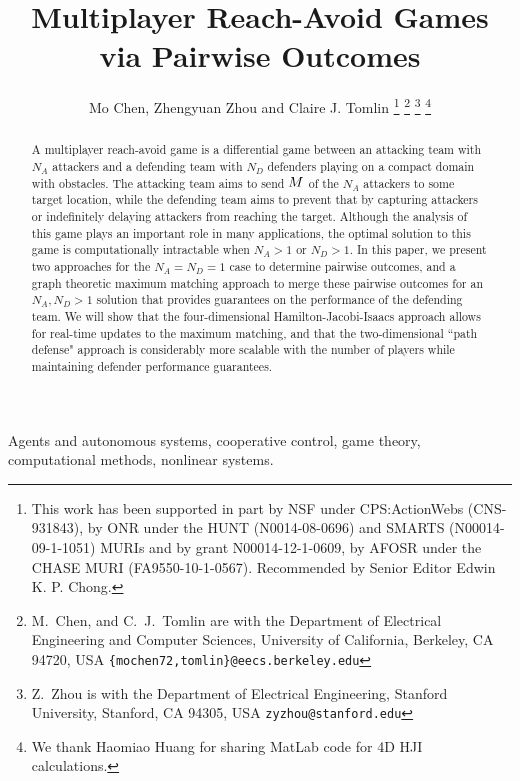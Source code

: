 \documentclass[journal]{IEEEtran}
\title{Multiplayer Reach-Avoid Games via Pairwise Outcomes}
\author{Mo Chen, Zhengyuan Zhou and Claire J. Tomlin%
\thanks{This work has been supported in part by NSF under CPS:ActionWebs (CNS-931843), by ONR under the HUNT (N0014-08-0696) and SMARTS (N00014-09-1-1051) MURIs and by grant N00014-12-1-0609, by AFOSR under the CHASE MURI (FA9550-10-1-0567). Recommended by Senior Editor Edwin K. P. Chong.}%
\thanks{M.~Chen, and C.~J.~Tomlin are with the Department of Electrical Engineering and Computer Sciences,
        University of California, Berkeley, CA 94720, USA
        {\tt\small \{mochen72,tomlin\}@eecs.berkeley.edu}}
\thanks{Z.~Zhou is with the Department of Electrical Engineering,
        Stanford University, Stanford, CA 94305, USA
        {\tt\small zyzhou@stanford.edu}}   
\thanks{We thank Haomiao Huang for sharing MatLab code for 4D HJI calculations.}
}
\newcommand{\NA}{N_A}
\newcommand{\ND}{N_D}
\begin{document}
\maketitle
\thispagestyle{empty}
\pagestyle{empty}


\begin{abstract}
A multiplayer reach-avoid game is a differential game between an attacking team with $\NA$ attackers and a defending team with $\ND$ defenders playing on a compact domain with obstacles. The attacking team aims to send $M$ of the $\NA$ attackers to some target location, while the defending team aims to prevent that by capturing attackers or indefinitely delaying attackers from reaching the target. Although the analysis of this game plays an important role in many applications, the optimal solution to this game is computationally intractable when $\NA>1$ or $\ND>1$. In this paper, we present two approaches for the $\NA=\ND=1$ case to determine pairwise outcomes, and a graph theoretic maximum matching approach to merge these pairwise outcomes for an $\NA,\ND>1$ solution that provides guarantees on the performance of the defending team. We will show that the four-dimensional Hamilton-Jacobi-Isaacs approach allows for real-time updates to the maximum matching, and that the two-dimensional ``path defense" approach is considerably more scalable with the number of players while maintaining defender performance guarantees.
\end{abstract}

\begin{IEEEkeywords}
Agents and autonomous systems, cooperative control, game theory, computational methods, nonlinear systems.
\end{IEEEkeywords}

 

% 






\end{document}
